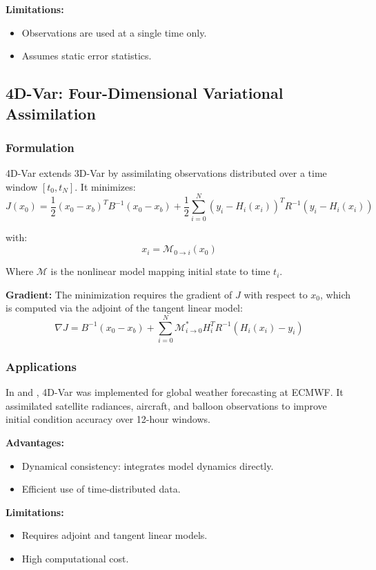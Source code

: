 \documentclass[a4paper]{article}
\begin{document}
\textbf{Limitations:}
\begin{itemize}
  \item Observations are used at a single time only.
  \item Assumes static error statistics.
\end{itemize}

\subsection{4D-Var: Four-Dimensional Variational Assimilation}

\subsubsection*{Formulation}

4D-Var extends 3D-Var by assimilating observations distributed over a time window $[t_0, t_N]$. It minimizes:
\[
J(x_0) = \frac{1}{2}(x_0 - x_b)^T B^{-1}(x_0 - x_b) + \frac{1}{2} \sum_{i=0}^{N} \left( y_i - H_i(x_i) \right)^T R^{-1} \left( y_i - H_i(x_i) \right)
\]

with:
\[
x_i = \mathcal{M}_{0 \rightarrow i}(x_0)
\]

Where $\mathcal{M}$ is the nonlinear model mapping initial state to time $t_i$.

\textbf{Gradient:}
The minimization requires the gradient of $J$ with respect to $x_0$, which is computed via the adjoint of the tangent linear model:
\[
\nabla J = B^{-1}(x_0 - x_b) + \sum_{i=0}^{N} \mathcal{M}^*_{i \rightarrow 0} H_i^T R^{-1}(H_i(x_i) - y_i)
\]

\subsubsection*{Applications}

In \textcite{courtier1994strategy} and \textcite{courtier1999assimilation}, 4D-Var was implemented for global weather forecasting at ECMWF. It assimilated satellite radiances, aircraft, and balloon observations to improve initial condition accuracy over 12-hour windows.

\textbf{Advantages:}
\begin{itemize}
  \item Dynamical consistency: integrates model dynamics directly.
  \item Efficient use of time-distributed data.
\end{itemize}

\textbf{Limitations:}
\begin{itemize}
  \item Requires adjoint and tangent linear models.
  \item High computational cost.
\end{itemize}
\end{document}
